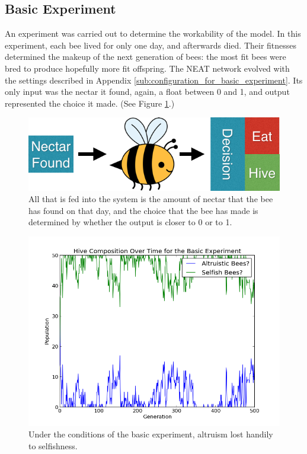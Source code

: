 \documentclass[11pt]{article}
\begin{document}
		\subsection{Basic Experiment} %
		\label{sub:basic_experiment}
			An experiment was carried out to determine the workability of the model. In this experiment, each bee lived for only one day, and afterwards died. Their fitnesses determined the makeup of the next generation of bees: the most fit bees were bred to produce hopefully more fit offspring. The NEAT network evolved with the settings described in Appendix \ref{sub:configuration_for_basic_experiment}. Its only input was the nectar it found, again, a float between 0 and 1, and output represented the choice it made. (See Figure \ref{fig:naive_system}.)

			\begin{figure}[tb]
				\begin{center}
					\includegraphics[scale=.5]{bee_diagrams/naive_system.png}
				\end{center}
				\caption{All that is fed into the system is the amount of nectar that the bee has found on that day, and the choice that the bee has made is determined by whether the output is closer to 0 or to 1.}
				\label{fig:naive_system}
			\end{figure}

			\begin{figure}[tb]
				\begin{center}
					\includegraphics[scale=.5]{results/basic_comp.png}
				\end{center}
				\caption{Under the conditions of the basic experiment, altruism lost handily to selfishness.}
				\label{fig:basic_experiment_composition}
			\end{figure}
\end{document}
